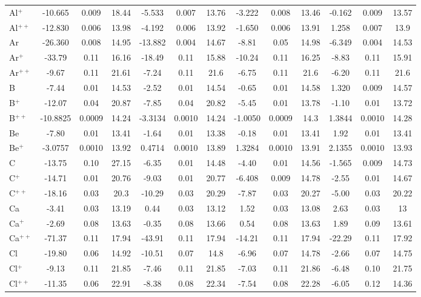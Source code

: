 \begin{longtable}{l!{\vrule width 0.25pt}ccc!{\vrule width 0.25pt}ccc!{\vrule width 0.25pt}ccc!{\vrule width 0.25pt}ccc}
Al$^+$ & -10.665 & 0.009 & 18.44 & -5.533 & 0.007 & 13.76 & -3.222 & 0.008 & 13.46 & -0.162 & 0.009 & 13.57 \\
Al$^{++}$ & -12.830 & 0.006 & 13.98 & -4.192 & 0.006 & 13.92 & -1.650 & 0.006 & 13.91 & 1.258 & 0.007 & 13.9 \\
Ar & -26.360 & 0.008 & 14.95 & -13.882 & 0.004 & 14.67 & -8.81 & 0.05 & 14.98 & -6.349 & 0.004 & 14.53 \\
Ar$^+$ & -33.79 & 0.11 & 16.16 & -18.49 & 0.11 & 15.88 & -10.24 & 0.11 & 16.25 & -8.83 & 0.11 & 15.91 \\
Ar$^{++}$ & -9.67 & 0.11 & 21.61 & -7.24 & 0.11 & 21.6 & -6.75 & 0.11 & 21.6 & -6.20 & 0.11 & 21.6 \\
B & -7.44 & 0.01 & 14.53 & -2.52 & 0.01 & 14.54 & -0.65 & 0.01 & 14.58 & 1.320 & 0.009 & 14.57 \\
B$^+$ & -12.07 & 0.04 & 20.87 & -7.85 & 0.04 & 20.82 & -5.45 & 0.01 & 13.78 & -1.10 & 0.01 & 13.72 \\
B$^{++}$ & -10.8825 & 0.0009 & 14.24 & -3.3134 & 0.0010 & 14.24 & -1.0050 & 0.0009 & 14.3 & 1.3844 & 0.0010 & 14.28 \\
Be & -7.80 & 0.01 & 13.41 & -1.64 & 0.01 & 13.38 & -0.18 & 0.01 & 13.41 & 1.92 & 0.01 & 13.41 \\
Be$^+$ & -3.0757 & 0.0010 & 13.92 & 0.4714 & 0.0010 & 13.89 & 1.3284 & 0.0010 & 13.91 & 2.1355 & 0.0010 & 13.93 \\
C & -13.75 & 0.10 & 27.15 & -6.35 & 0.01 & 14.48 & -4.40 & 0.01 & 14.56 & -1.565 & 0.009 & 14.73 \\
C$^+$ & -14.71 & 0.01 & 20.76 & -9.03 & 0.01 & 20.77 & -6.408 & 0.009 & 14.78 & -2.55 & 0.01 & 14.67 \\
C$^{++}$ & -18.16 & 0.03 & 20.3 & -10.29 & 0.03 & 20.29 & -7.87 & 0.03 & 20.27 & -5.00 & 0.03 & 20.22 \\
Ca & -3.41 & 0.03 & 13.19 & 0.44 & 0.03 & 13.12 & 1.52 & 0.03 & 13.08 & 2.63 & 0.03 & 13 \\
Ca$^+$ & -2.69 & 0.08 & 13.63 & -0.35 & 0.08 & 13.66 & 0.54 & 0.08 & 13.63 & 1.89 & 0.09 & 13.61 \\
Ca$^{++}$ & -71.37 & 0.11 & 17.94 & -43.91 & 0.11 & 17.94 & -14.21 & 0.11 & 17.94 & -22.29 & 0.11 & 17.92 \\
Cl & -19.80 & 0.06 & 14.92 & -10.51 & 0.07 & 14.8 & -6.96 & 0.07 & 14.78 & -2.66 & 0.07 & 14.75 \\
Cl$^+$ & -9.13 & 0.11 & 21.85 & -7.46 & 0.11 & 21.85 & -7.03 & 0.11 & 21.86 & -6.48 & 0.10 & 21.75 \\
Cl$^{++}$ & -11.35 & 0.06 & 22.91 & -8.38 & 0.08 & 22.34 & -7.54 & 0.08 & 22.28 & -6.05 & 0.12 & 14.36 \\

\end{longtable}

